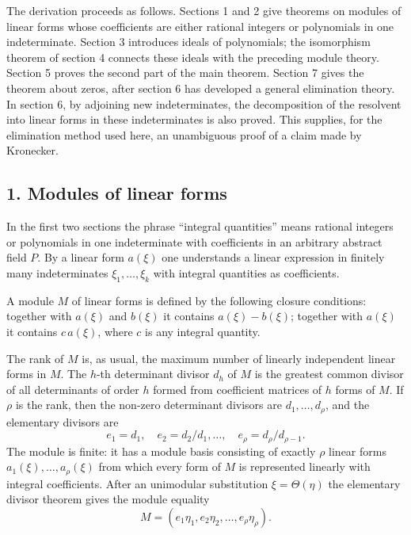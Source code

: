 \documentclass[11pt]{article}
\begin{document}
The derivation proceeds as follows. Sections 1 and 2 give theorems on modules of linear forms whose coefficients are either rational integers or polynomials in one indeterminate. Section 3 introduces ideals of polynomials; the isomorphism theorem of section 4 connects these ideals with the preceding module theory. Section 5 proves the second part of the main theorem. Section 7 gives the theorem about zeros, after section 6 has developed a general elimination theory. In section 6, by adjoining new indeterminates, the decomposition of the resolvent into linear forms in these indeterminates is also proved. This supplies, for the elimination method used here, an unambiguous proof of a claim made by Kronecker.

\subsection{1. Modules of linear forms}

In the first two sections the phrase ``integral quantities'' means rational integers or polynomials in one indeterminate with coefficients in an arbitrary abstract field $P$. By a linear form $a(\xi)$ one understands a linear expression in finitely many indeterminates $\xi_1,\ldots,\xi_k$ with integral quantities as coefficients.

A module $M$ of linear forms is defined by the following closure conditions: together with $a(\xi)$ and $b(\xi)$ it contains $a(\xi)-b(\xi)$; together with $a(\xi)$ it contains $c\,a(\xi)$, where $c$ is any integral quantity.

The rank of $M$ is, as usual, the maximum number of linearly independent linear forms in $M$. The $h$-th determinant divisor $d_h$ of $M$ is the greatest common divisor of all determinants of order $h$ formed from coefficient matrices of $h$ forms of $M$. If $\rho$ is the rank, then the non-zero determinant divisors are $d_1,\ldots,d_\rho$, and the elementary divisors are
\[
  e_1=d_1,
  \quad e_2=d_2/d_1,
  \ldots,
  \quad e_\rho=d_\rho/d_{\rho-1}.
\]
The module is finite: it has a module basis consisting of exactly $\rho$ linear forms $a_1(\xi),\ldots,a_\rho(\xi)$ from which every form of $M$ is represented linearly with integral coefficients. After an unimodular substitution $\xi=\Theta(\eta)$ the elementary divisor theorem gives the module equality
\begin{equation}
  M=(e_1\eta_1,e_2\eta_2,\ldots,e_\rho\eta_\rho).                  \tag{1}
\end{equation}
\end{document}
